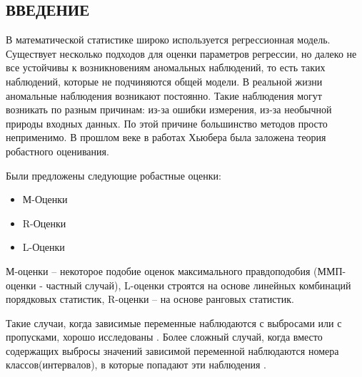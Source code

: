 \begin{center}
    \section*{ВВЕДЕНИЕ}
\end{center}
{}

В математической статистике широко используется регрессионная модель.
Существует несколько подходов для оценки параметров регрессии, но далеко не все устойчивы к возникновениям аномальных наблюдений, 
то есть таких наблюдений, которые не подчиняются общей модели. 
В реальной жизни аномальные наблюдения возникают постоянно. 
Такие наблюдения могут возникать по разным причинам: из-за ошибки измерения, из-за необычной природы входных данных.
По этой причине большинство методов просто неприменимо.
В прошлом веке в работах Хьюбера была заложена теория робастного оценивания.

Были предложены следующие робастные оценки\cite{Huber}:
\begin{itemize}
    \item М-Оценки
    \item R-Оценки
    \item L-Оценки
\end{itemize}
М-оценки -- некоторое подобие оценок максимального правдоподобия (ММП-оценки - частный случай), L-оценки строятся на основе линейных комбинаций порядковых статистик, R-оценки -- на основе ранговых статистик.

Такие случаи, когда зависимые переменные наблюдаются с выбросами или с пропусками, хорошо исследованы \cite{OLSforGrouping}. Более сложный случай, когда вместо содержащих выбросы значений зависимой переменной наблюдаются номера классов(интервалов), в которые попадают эти наблюдения \cite{technometrics}.
